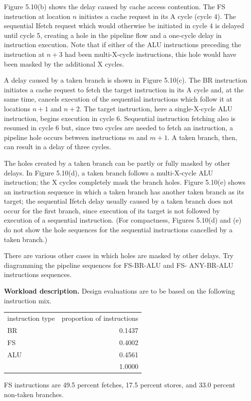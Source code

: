 Figure 5.10(b) shows the delay caused by cache access contention. The FS
instruction at location $n$ initiates a cache request in its A cycle (cycle 4). The
sequential Ifetch request which would otherwise be initiated in cycle 4 is
delayed until cycle 5, creating a hole in the pipeline flow and a one-cycle
delay in instruction execution. Note that if either of the ALU instructions
preceding the instruction at $n+3$ had been multi-X-cycle instructions, this
hole would have been masked by the additional X cycles.

A delay caused by a taken branch is shown in Figure 5.10(c). The BR
instruction initiates a cache request to fetch the target instruction in its A
cycle and, at the same time, cancels execution of the sequential instructions
which follow it at locations $n+1$ and $n+2$. The target instruction, here a
single-X-cycle ALU instruction, begins execution in cycle 6. Sequential
instruction fetching also is resumed in cycle 6 but, since two cycles are needed
to fetch an instruction, a pipeline hole occurs between instructions $m$ and $m+1$.
A taken branch, then, can result in a delay of three cycles.

The holes created by a taken branch can be partly or fully masked by
other delays. In Figure 5.10(d), a taken branch follows a multi-X-cycle ALU
instruction; the X cycles completely mask the branch holes. Figure 5.10(e)
shows an instruction sequence in which a taken branch has another taken
branch as its target; the sequential Ifetch delay usually caused by a taken
branch does not occur for the first branch, since execution of its target is not
followed by execution of a sequential instruction. (For compactness, Figures
5.10(d) and (e) do not show the hole sequences for the sequential instructions
cancelled by a taken branch.)

There are various other cases in which holes are masked by other
delays. Try diagramming the pipeline sequences for FS-BR-ALU and FS-
ANY-BR-ALU instructions sequences.

\noindent\textbf{Workload description.} Design evaluations are to be based on the following instruction mix.
\begin{center}
\begin{tabular}{lr}
instruction type & proportion of instructions \\
BR & 0.1437 \\
FS & 0.4002 \\
ALU & 0.4561 \\
 & 1.0000
\end{tabular}
\end{center}
FS instructions are 49.5 percent fetches, 17.5 percent stores, and 33.0 percent
non-taken branches.

